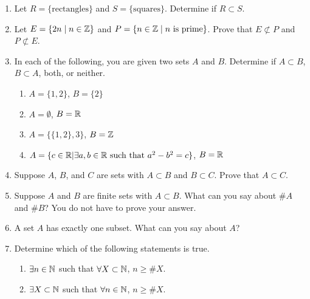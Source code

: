 \probsec{~\ref{sec:subsets}}
\begin{enumerate}
  \item Let $R = \{\text{rectangles}\}$ and $S = \{\text{squares}\}$. Determine if $R \subset S$.

  \item Let $E = \{2n \mid n \in \mathbb{Z}\}$ and $P = \{n \in \mathbb{Z} \mid n \text{ is prime}\}$. Prove that $E \not\subset P$ and $P \not\subset E$.

  \item In each of the following, you are given two sets $A$ and $B$. Determine if $A \subset B$, $B \subset A$, both, or neither.
\begin{enumerate}
    \item $A = \{1, 2\}$, $B = \{2\}$
    \item $A = \emptyset$, $B = \mathbb{R}$
    \item $A = \{\{1,2\}, 3\}$, $B = \mathbb{Z}$
    \item $A = \{c \in \mathbb{R} | \exists a, b \in \mathbb{R} \text{ such that } a^2 - b^2 = c\}$, $B = \mathbb{R}$
\end{enumerate}


  \item Suppose $A$, $B$, and $C$ are sets with $A \subset B$ and $B \subset C$. Prove that $A \subset C$.

  \item Suppose $A$ and $B$ are finite sets with $A \subset B$. What can you say about $\# A$ and $\# B$? You do not have to prove your answer.

  \item A set $A$ has exactly one subset. What can you say about $A$?

    \item Determine which of the following statements is true.
  \begin{enumerate}
      \item $\exists n \in \mathbb{N}$ such that $\forall X \subset \mathbb{N}$, $n \geq \# X$.
      \item $\exists X \subset \mathbb{N}$ such that $\forall n \in \mathbb{N}$, $n \geq \# X$.
  \end{enumerate}
\end{enumerate}
